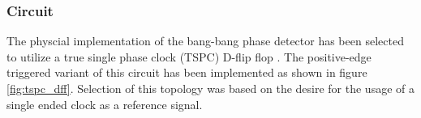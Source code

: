 





		\FloatBarrier






		\subsubsection{Circuit}
		The physcial implementation of the bang-bang phase detector has been selected to utilize a true single phase clock (TSPC) D-flip flop \cite{Yuan1989}. The positive-edge triggered variant of this circuit has been implemented as shown in figure \ref{fig:tspc_dff}. Selection of this topology was based on the desire for the usage of a single ended clock as a reference signal.

